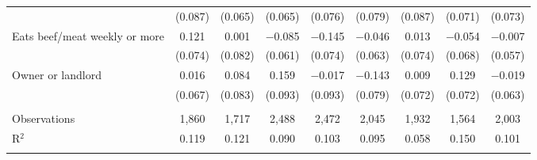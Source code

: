\begin{tabular}{@{\extracolsep{5pt}}lcccccccc}
  & (0.087) & (0.065) & (0.065) & (0.076) & (0.079) & (0.087) & (0.071) & (0.073) \\ 
  Eats beef/meat weekly or more & 0.121 & 0.001 & $-$0.085 & $-$0.145 & $-$0.046 & 0.013 & $-$0.054 & $-$0.007 \\ 
  & (0.074) & (0.082) & (0.061) & (0.074) & (0.063) & (0.074) & (0.068) & (0.057) \\ 
  Owner or landlord & 0.016 & 0.084 & 0.159 & $-$0.017 & $-$0.143 & 0.009 & 0.129 & $-$0.019 \\ 
  & (0.067) & (0.083) & (0.093) & (0.093) & (0.079) & (0.072) & (0.072) & (0.063) \\ 
 \hline \\[-1.8ex] 

Observations & 1,860 & 1,717 & 2,488 & 2,472 & 2,045 & 1,932 & 1,564 & 2,003 \\ 
R$^{2}$ & 0.119 & 0.121 & 0.090 & 0.103 & 0.095 & 0.058 & 0.150 & 0.101 \\ 
\hline 
\hline \\[-1.8ex] 
\end{tabular} 
